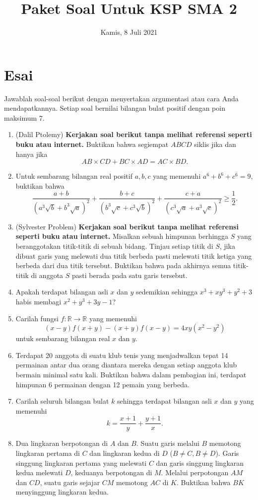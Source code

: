 \documentclass{article}
\title{Paket Soal Untuk KSP SMA 2}
\date{Kamis, 8 Juli 2021}
\begin{document}
	\maketitle

\section{Esai}
Jawablah soal-soal berikut dengan menyertakan argumentasi atau cara Anda mendapatkannya. Setiap soal bernilai bilangan bulat positif dengan poin maksimum 7.

\begin{enumerate}[resume]
	\item (Dalil Ptolemy) \textbf{Kerjakan soal berikut tanpa melihat referensi seperti buku atau internet.} Buktikan bahwa segiempat $ABCD$ siklis jika dan hanya jika $$AB \times CD + BC \times AD = AC \times BD.$$
	
	\item Untuk sembarang bilangan real positif $a,b,c$ yang memenuhi $a^6+b^6+c^6=9$, buktikan bahwa $$\dfrac{a+b}{(a^3\sqrt{b}+b^3\sqrt{a})^2}+\dfrac{b+c}{(b^3\sqrt{c}+c^3\sqrt{b})^2}+\dfrac{c+a}{(c^3\sqrt{a}+a^3\sqrt{c})^2} \ge \dfrac{1}{2}.$$
	
	\item (Sylvester Problem) \textbf{Kerjakan soal berikut tanpa melihat referensi seperti buku atau internet. } Misalkan sebuah himpunan berhingga $S$ yang beranggotakan titik-titik di sebuah bidang. Tinjau setiap titik di $S$, jika dibuat garis yang melewati dua titik berbeda pasti melewati titik ketiga yang berbeda dari dua titik tersebut. Buktikan bahwa pada akhirnya semua titik-titik di anggota $S$ pasti berada pada satu garis tersebut.
	
	\item Apakah terdapat bilangan asli $x$ dan $y$ sedemikian sehingga $x^3+xy^3+y^2+3$ habis membagi $x^2+y^3+3y-1$?
	
	\item Carilah fungsi $f:\mathbb{R} \rightarrow \mathbb{R}$ yang memenuhi $$(x-y)f(x+y)-(x+y)f(x-y) = 4xy(x^2-y^2)$$ untuk sembarang bilangan real $x$ dan $y$.
	
	\item Terdapat 20 anggota di suatu klub tenis yang menjadwalkan tepat 14 permainan antar dua orang diantara mereka dengan setiap anggota klub bermain minimal satu kali. Buktikan bahwa dalam pembagian ini, terdapat himpunan 6 permainan dengan 12 pemain yang berbeda.
	
	\item Carilah seluruh bilangan bulat $k$ sehingga terdapat bilangan asli $x$ dan $y$ yang memenuhi $$k= \frac{x+1}{y}+\frac{y+1}{x}.$$ 
	
	\item Dua lingkaran berpotongan di $A$ dan $B$. Suatu garis melalui $B$ memotong lingkaran pertama di $C$ dan lingkaran kedua di $D$ ($B \neq C, B \neq D$).  Garis singgung lingkaran pertama yang melewati $C$ dan garis singgung lingkaran kedua melewati $D$, keduanya berpotongan di $M$. Melalui perpotongan $AM$ dan $CD$, suatu garis sejajar $CM$ memotong $AC$ di $K$. Buktikan bahwa $BK$ menyinggung lingkaran kedua.
	
\end{enumerate}
\end{document}
